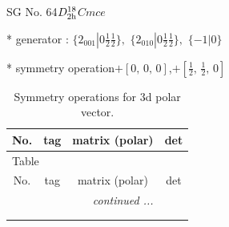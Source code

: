 \documentclass[fleqn,8pt]{jsarticle}
\begin{document}
\setcounter{MaxMatrixCols}{32}

\renewcommand{\tablename}{Table~}
\renewcommand{\figurename}{Figure~}
\begin{center}
\LARGE
SG No. 64\quad$D_{\rm 2h}^{18}$\quad$Cmce$\quad[ orthorhombic ]
\end{center}

* generator : $\{2{}_{001}|0 \frac{1}{2} \frac{1}{2}\},\,\,\{2{}_{010}|0 \frac{1}{2} \frac{1}{2}\},\,\,\{-1|0\}$

* symmetry operation\quad$+\left[ 0,\, 0,\, 0 \right]$,\quad $+\left[ \frac{1}{2},\, \frac{1}{2},\, 0 \right]$
\renewcommand{\arraystretch}{1.3}
\begin{longtable}{cccc}
\caption{Symmetry operations for 3d polar vector.}
 \\
 \hline \hline
No. & tag & matrix (polar) & det \\ \hline \endfirsthead

\multicolumn{3}{l}{\tablename\ \thetable{}} \\
 \hline \hline
No. & tag & matrix (polar) & det \\ \hline \endhead

 \hline \hline
\multicolumn{3}{r}{\footnotesize\it continued ...} \\ \endfoot

 \hline \hline
\multicolumn{3}{r}{} \\ \endlastfoot


\end{longtable}
\end{document}
